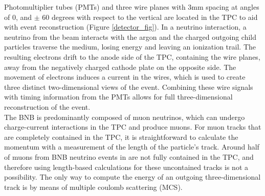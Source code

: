 Photomultiplier tubes (PMTs) and three wire planes with 3mm spacing at angles of 0, and $\pm$ 60 degrees with respect to the vertical are located in the TPC to aid with event reconstruction (Figure \ref{detector_fig}). In a neutrino interaction, a neutrino from the beam interacts with the argon and the charged outgoing child particles traverse the medium, losing energy and leaving an ionization trail. The resulting electrons drift to the anode side of the TPC, containing the wire planes, away from the negatively charged cathode plate on the opposite side. The movement of electrons induces a current in the wires, which is used to create three distinct two-dimensional views of the event. Combining these wire signals with timing information from the PMTs allows for full three-dimensional reconstruction of the event.\\





The BNB is predominantly composed of muon neutrinos, which can undergo charge-current interactions in the TPC and produce muons. For muon tracks that are completely contained in the TPC, it is straightforward to calculate the momentum with a measurement of the length of the particle's track. Around half of muons from BNB neutrino events in {\ub} are not fully contained in the TPC, and therefore using length-based calculations for these uncontained tracks is not a possibility. The only way to compute the energy of an outgoing three-dimensional track is by means of multiple coulomb scattering (MCS). \\

